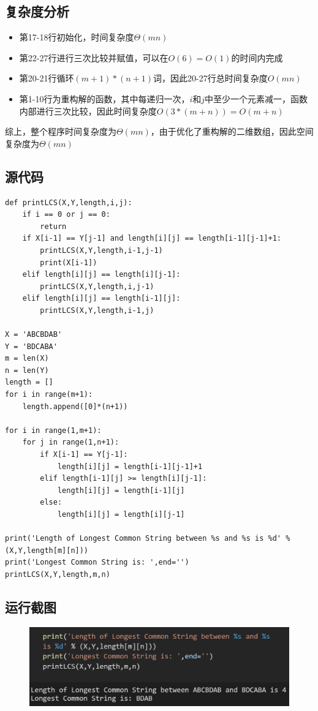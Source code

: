 \documentclass{ctexart}[UTF8]
\begin{document}
    \subsection{复杂度分析}
    \begin{itemize}
        \item 第17-18行初始化，时间复杂度$\Theta(mn)$
        \item 第22-27行进行三次比较并赋值，可以在$O(6) = O(1)$的时间内完成
        \item 第20-21行循环$(m+1)*(n+1)$词，因此20-27行总时间复杂度$O(mn)$
        \item 第1-10行为重构解的函数，其中每递归一次，$i$和$j$中至少一个元素减一，函数内部进行三次比较，因此时间复杂度$O(3*(m+n)) = O(m+n)$
    \end{itemize}
    \par 综上，整个程序时间复杂度为$\Theta(mn)$，由于优化了重构解的二维数组，因此空间复杂度为$\Theta(mn)$
    \subsection{源代码}
    \begin{lstlisting}
def printLCS(X,Y,length,i,j):
    if i == 0 or j == 0:
        return
    if X[i-1] == Y[j-1] and length[i][j] == length[i-1][j-1]+1:
        printLCS(X,Y,length,i-1,j-1)
        print(X[i-1])
    elif length[i][j] == length[i][j-1]:
        printLCS(X,Y,length,i,j-1)
    elif length[i][j] == length[i-1][j]:
        printLCS(X,Y,length,i-1,j)
        
X = 'ABCBDAB'
Y = 'BDCABA'
m = len(X)
n = len(Y)
length = []
for i in range(m+1):
    length.append([0]*(n+1))

for i in range(1,m+1):
    for j in range(1,n+1):
        if X[i-1] == Y[j-1]:
            length[i][j] = length[i-1][j-1]+1
        elif length[i-1][j] >= length[i][j-1]:
            length[i][j] = length[i-1][j]
        else:
            length[i][j] = length[i][j-1]

print('Length of Longest Common String between %s and %s is %d' % (X,Y,length[m][n]))
print('Longest Common String is: ',end='')
printLCS(X,Y,length,m,n)
    \end{lstlisting}
    \subsection{运行截图}
    \begin{figure}[H]
        \centering
        \includegraphics[width=12cm]{../Resources/8_1.png}
    \end{figure}
    \clearpage
\end{document}
